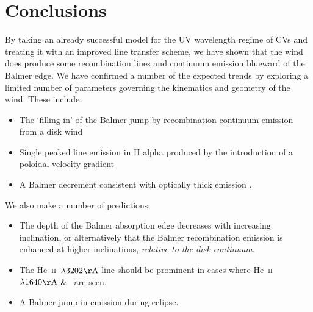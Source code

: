 \documentclass[preprint, a4paper, 11pt]{aastex}
\begin{document}






\newpage
%
%


\section{Conclusions}

By taking an already successful model
for the UV wavelength regime of CVs and treating 
it with an improved line transfer scheme, we have shown
that the wind does produce some recombination lines
and continuum emission blueward of the Balmer edge.
We have confirmed a number of the expected trends
by exploring a limited number of parameters governing the
kinematics and geometry of the wind. These include:

\renewcommand{\labelitemi}{$\bullet$}
\begin{itemize}
	\item The `filling-in' of the Balmer jump \citep{elitzur1983} by recombination 
	continuum emission from a disk wind
	\item Single peaked line emission in H alpha produced by 
	the introduction of a poloidal velocity gradient \citep{MC96}
	\item A Balmer decrement consistent with optically thick emission \citep{elitzur1983}.
\end{itemize}
\smallskip

\noindent We also make a number of predictions:

\begin{itemize}
	\item The depth of the Balmer absorption edge decreases with increasing inclination,
or alternatively that the Balmer recombination emission
is enhanced at higher inclinations, {\sl relative to the disk continuum}.
	\item The He~\textsc{ii}~$\lambda3202{\rm \AA}$ line should be
prominent in cases where He~\textsc{ii}~$\lambda1640{\rm \AA}$ \& 
\heiiopt\ are seen. 
	\item A Balmer jump in emission during eclipse.
\end{itemize}
\end{document}
